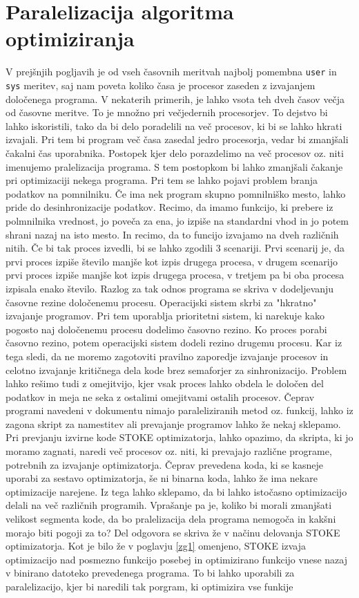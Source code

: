 \documentclass[a4paper, 12pt]{book}
\begin{document}
\chapter{Paralelizacija algoritma optimiziranja}

V prejšnjih pogljavih je od vseh časovnih meritvah najbolj pomembna \texttt{user} in \texttt{sys} meritev, saj nam poveta koliko časa je procesor zaseden z izvajanjem določenega programa. V nekaterih primerih, je lahko vsota teh dveh časov večja od  časovne meritve. To je množno pri večjedernih procesorjev. To dejstvo bi lahko iskoristili, tako da bi delo poradelili na več procesov, ki bi se lahko hkrati izvajali. Pri tem bi program več časa zasedal jedro procesorja, vedar bi zmanjšali čakalni čas uporabnika. Postopek kjer delo porazdelimo na več procesov oz. niti imenujemo pralelizacija programa. S tem postopkom bi lahko zmanjšali čakanje pri optimizaciji nekega programa. Pri tem se lahko pojavi problem branja podatkov na pomnilniku. Če ima nek program skupno pomnilniško mesto, lahko pride do desinhronizacije podatkov. Recimo, da imamo funkcijo, ki prebere iz polmnilnika vrednost, jo poveča za ena, jo izpiše na standardni vhod in jo potem shrani nazaj na isto mesto. In recimo, da to funcijo izvajamo na dveh različnih nitih. Če bi tak proces izvedli, bi se lahko zgodili 3 scenariji. Prvi scenarij je, da prvi proces izpiše število manjše kot izpis drugega procesa, v drugem scenarijo prvi proces izpiše manjše kot izpis drugega procesa, v tretjem pa bi oba procesa izpisala enako število. Razlog za tak odnos programa se skriva v dodeljevanju časovne rezine določenemu procesu. Operacijski sistem skrbi za "hkratno" izvajanje programov. Pri tem uporablja prioritetni sistem, ki narekuje kako pogosto naj določenemu procesu dodelimo časovno rezino. Ko proces porabi časovno rezino, potem operacijski sistem dodeli rezino drugemu procesu. Kar iz tega sledi, da ne moremo zagotoviti pravilno zaporedje izvajanje procesov in celotno izvajanje kritičnega dela kode brez semaforjer za sinhronizacijo. Problem lahko rešimo tudi z omejitvijo, kjer vsak proces lahko obdela le določen del podatkov in meja ne seka z ostalimi omejitvami ostalih procesov. Čeprav programi navedeni v dokumentu nimajo paraleliziranih metod oz. funkcij, lahko iz zagona skript za namestitev ali prevajanje programov lahko že nekaj sklepamo. Pri prevjanju izvirne kode STOKE optimizatorja, lahko opazimo, da skripta, ki jo moramo zagnati, naredi več procesov oz. niti, ki prevajajo različne programe, potrebnih za izvajanje optimizatorja. Čeprav prevedena koda, ki se kasneje uporabi za sestavo optimizatorja, še ni binarna koda, lahko že ima nekare optimizacije narejene. Iz tega lahko sklepamo, da bi lahko istočasno optimizacijo delali na več različnih programih. Vprašanje pa je, koliko bi morali zmanjšati velikost segmenta kode, da bo pralelizacija dela programa nemogoča in kakšni morajo biti pogoji za to? Del odgovora se skriva že v načinu delovanja STOKE optimizatorja. Kot je bilo že v poglavju \ref{zg1} omenjeno, STOKE izvaja optimizacijo nad posmezno funkcijo posebej in optimizirano funkcijo vnese nazaj v binirano datoteko prevedenega programa. To bi lahko uporabili za paralelizacijo, kjer bi naredili tak porgram, ki optimizira vse funkije 
\end{document}
